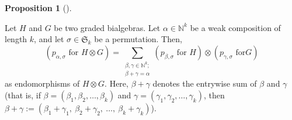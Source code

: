 \documentclass[numbers=enddot,12pt,final,onecolumn,notitlepage]{scrartcl}%
\theoremstyle{definition}
\newtheorem{prop}[theo]{Proposition}
\newenvironment{proposition}[1][]
{\begin{prop}[#1]\begin{leftbar}}
{\end{leftbar}\end{prop}}
\let\sumnonlimits\sum
\renewcommand{\sum}{\sumnonlimits\limits}
\begin{document}
\begin{proposition}
\label{prop.pas-on-tensors}Let $H$ and $G$ be two graded bialgebras. Let
$\alpha\in\mathbb{N}^{k}$ be a weak composition of length $k$, and let
$\sigma\in\mathfrak{S}_{k}$ be a permutation. Then,%
\[
\left(  p_{\alpha,\sigma}\text{ for }H\otimes G\right)  =\sum_{\substack{\beta
,\gamma\in\mathbb{N}^{k}\text{;}\\\beta+\gamma=\alpha}}\left(  p_{\beta
,\sigma}\text{ for }H\right)  \otimes\left(  p_{\gamma,\sigma}\text{ for
}G\right)
\]
as endomorphisms of $H\otimes G$. Here, $\beta+\gamma$ denotes the entrywise
sum of $\beta$ and $\gamma$ (that is, if $\beta=\left(  \beta_{1},\beta
_{2},\ldots,\beta_{k}\right)  $ and $\gamma=\left(  \gamma_{1},\gamma
_{2},\ldots,\gamma_{k}\right)  $, then $\beta+\gamma:=\left(  \beta_{1}%
+\gamma_{1},\ \beta_{2}+\gamma_{2},\ \ldots,\ \beta_{k}+\gamma_{k}\right)  $).
\end{proposition}
\end{document}
